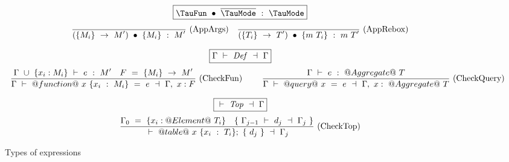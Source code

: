 \begin{figure*}
$$
\boxed{\TypecheckApp{\TauFun}{\ov{\TauMode}}{\TauMode}}
$$
$$
\enskip \frac {\displaystyle 
} {\displaystyle 
  (\{M_i\}~\to~M')~\bullet~\{M_i\}~:~M'
} \  \mbox{(AppArgs)} \enskip
\enskip \frac {\displaystyle 
} {\displaystyle 
  (\{T_i\}~\to~T')~\bullet~\{m~T_i\}~:~m~T'
} \  \mbox{(AppRebox)} \enskip
$$


$$
\boxed{\TypecheckS{\Gamma}{\mi{Def}}{\Gamma}}
$$
$$
\ruleIN
{
  \Typecheck{\Gamma~\cup~\{x_i:M_i\}}{e}{M'}
  \quad
  F~=~\{M_i\}~\to~M'
}
{
  \TypecheckS{\Gamma}{@function@~x~\{x_i~:~M_i\}~=~e}{\Gamma,~x:F}
}{CheckFun}~~~~
\ruleIN
{
  \Typecheck{\Gamma}{e}{@Aggregate@~T}
}
{
  \TypecheckS{\Gamma}{@query@~x~=~e}{\Gamma,~x:~@Aggregate@~T}
}{CheckQuery}
$$


$$
\boxed{\TypecheckS{}{\mi{Top}}{\Gamma}}
$$
$$
\ruleIN
{
  \Gamma_0~=~\{x_i:@Element@~T_i\}
  \quad
  \{~\TypecheckS{\Gamma_{j-1}}{d_j}{\Gamma_j}~\}
}
{
  \TypecheckS
    {}
    {
      @table@
      ~x~\{x_i~:~T_i\};
      ~\{~d_j~\}
    }
    {\Gamma_j}
}{CheckTop}
$$


\caption{Types of expressions}
\label{fig:source:type:exp}
\end{figure*}

